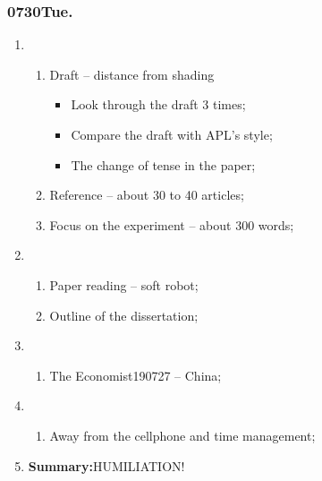 \subsubsection{0730Tue.}
\begin{enumerate}
	\item \ncquaone
	\begin{enumerate}[(1)]
		\item Draft -- distance from shading
		\begin{itemize}
			\item Look through the draft 3 times;\rightundoneBlack
			\item Compare the draft with APL's style;\rightundoneBlack
			\item The change of tense in the paper;\rightundoneBlack
		\end{itemize}
		\item Reference -- about 30 to 40 articles;\rightundoneBlack
		\item Focus on the experiment -- about 300 words;\rightundoneBlack 
	\end{enumerate}
	
	\item \ncquatwo	
	\begin{enumerate}[(1)]
		\item Paper reading -- soft robot;\rightundoneBlack
		\item Outline of the dissertation;\rightundoneBlack
	\end{enumerate}
	
	\item \ncquathree
	\begin{enumerate}[(1)]
		\item The Economist190727 -- China;\rightundoneBlack
	\end{enumerate}
	
	\item \ncquafour
	\begin{enumerate}[(1)]
		\item Away from the cellphone and time management;\rightundoneBlack
	\end{enumerate}
	\item \textbf{Summary:}HUMILIATION! 
\end{enumerate}
